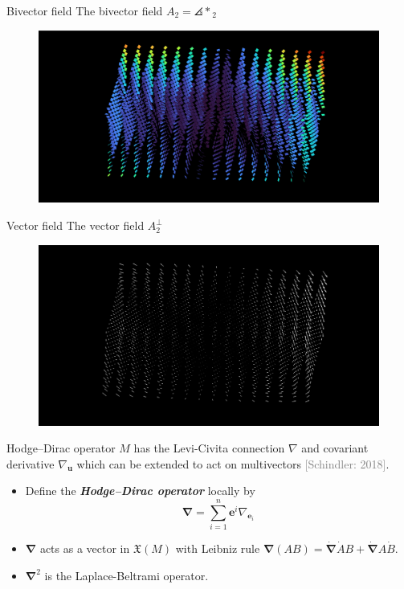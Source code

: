 \documentclass[aspectratio=169,handout]{beamer}
\newcommand\boldgreen[1]{\textcolor{lighter_csu_green}{\emph{\textbf{#1}}}}
\newcommand\grey[1]{\textcolor{gray}{#1}}
\newcommand{\grad}{\boldsymbol{\nabla}}
\newcommand{\blade}[1]{\boldsymbol{#1}}
\DeclarePairedDelimiter\angles{\langle}{\rangle}
\newcommand{\proj}[2]{\angles*{#2}_{#1}}
\newcommand{\smoothfields}{\mathfrak{X}}
\begin{document}
\begin{frame}{Bivector field}
\vfill
The bivector field $A_2 = \proj{2}{}$
\begin{figure}[h]
    \centering
    \includegraphics[width=\textwidth]{figures/plane_field}
\end{figure}
\hfill
\vfill
\end{frame}

\begin{frame}{Vector field}
\vfill
The vector field $A_2^\perp$
\begin{figure}[h]
    \centering
    \includegraphics[width=\textwidth]{figures/vector_field}
\end{figure}
\hfill
\vfill
\end{frame}

\begin{frame}{Hodge--Dirac operator}
\vfill
\pause
    $M$ has the Levi-Civita connection $\nabla$ and covariant derivative $\nabla_{\blade{u}}$ which can be extended to act on multivectors \grey{[Schindler: 2018]}.
    \pause
    \begin{itemize}
        \item Define the \boldgreen{Hodge--Dirac operator} locally by
        \[
        \grad = \sum_{i=1}^n \blade{e}^i \nabla_{\blade{e}_i}
        \]
        \pause
        \item $\grad$ acts as a vector in $\smoothfields(M)$ with Leibniz rule $\grad(AB) = \dot{\grad}\dot{A}B + \dot{\grad}A\dot{B}$.
        \pause
        \item $\grad^2$ is the Laplace-Beltrami operator.
    \end{itemize}
\vfill
\end{frame}
\end{document}
